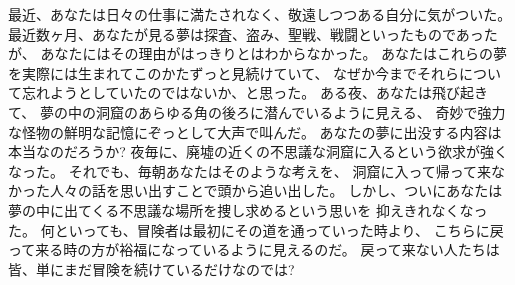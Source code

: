 最近、あなたは日々の仕事に満たされなく、敬遠しつつある自分に気がついた。
最近数ヶ月、あなたが見る夢は探査、盗み、聖戦、戦闘といったものであったが、
あなたにはその理由がはっきりとはわからなかった。
あなたはこれらの夢を実際には生まれてこのかたずっと見続けていて、
なぜか今までそれらについて忘れようとしていたのではないか、と思った。
ある夜、あなたは飛び起きて、
夢の中の洞窟のあらゆる角の後ろに潜んでいるように見える、
奇妙で強力な怪物の鮮明な記憶にぞっとして大声で叫んだ。
あなたの夢に出没する内容は本当なのだろうか?
夜毎に、廃墟の近くの不思議な洞窟に入るという欲求が強くなった。
それでも、毎朝あなたはそのような考えを、
洞窟に入って帰って来なかった人々の話を思い出すことで頭から追い出した。
しかし、ついにあなたは夢の中に出てくる不思議な場所を捜し求めるという思いを
抑えきれなくなった。
何といっても、冒険者は最初にその道を通っていった時より、
こちらに戻って来る時の方が裕福になっているように見えるのだ。
戻って来ない人たちは皆、単にまだ冒険を続けているだけなのでは?

